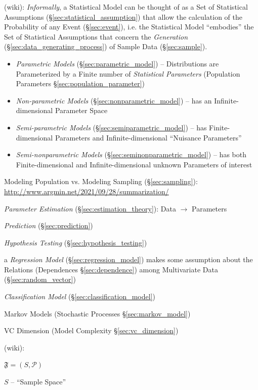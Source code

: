 (wiki): \emph{Informally}, a Statistical Model can be thought of as a Set of
Statistical Assumptions (\S\ref{sec:statistical_assumption}) that allow the
calculation of the Probability of any Event (\S\ref{sec:event}), i.e. the
Statistical Model ``embodies'' the Set of Statistical Assumptions that concern
the \emph{Generation} (\S\ref{sec:data_generating_process}) of Sample Data
(\S\ref{sec:sample}).

\begin{itemize}
  \item \emph{Parametric Models} (\S\ref{sec:parametric_model}) -- Distributions
    are Parameterized by a Finite number of \emph{Statistical Parameters}
    (Population Parameters \S\ref{sec:population_parameter})
  \item \emph{Non-parametric Models} (\S\ref{sec:nonparametric_model})
    -- has an Infinite-dimensional Parameter Space
  \item \emph{Semi-parametric Models} (\S\ref{sec:semiparametric_model}) -- has
    Finite-dimensional Parameters and Infinite-dimensional
    ``Nuisance Parameters''
  \item \emph{Semi-nonparametric Models} (\S\ref{sec:seminonparametric_model})
    -- has both Finite-dimensional and Infinite-dimensional unknown Parameters
    of interest
\end{itemize}

\fist Modeling Population vs. Modeling Sampling (\S\ref{sec:sampling}):
\url{http://www.argmin.net/2021/09/28/summarization/}

\emph{Parameter Estimation} (\S\ref{sec:estimation_theory}): Data $\to$
Parameters

\emph{Prediction} (\S\ref{sec:prediction})

\emph{Hypothesis Testing} (\S\ref{sec:hypothesis_testing})

\fist a \emph{Regression Model} (\S\ref{sec:regression_model}) makes some
assumption about the Relations (Dependences \S\ref{sec:dependence}) among
Multivariate Data (\S\ref{sec:random_vector})

\fist \emph{Classification Model} (\S\ref{sec:classification_model})

\fist Markov Models (Stochastic Processes \S\ref{sec:markov_model})

VC Dimension (Model Complexity \S\ref{sec:vc_dimension})

(wiki):

$\mathfrak{F} = (S, \mathcal{P})$

$S$ -- ``Sample Space''


